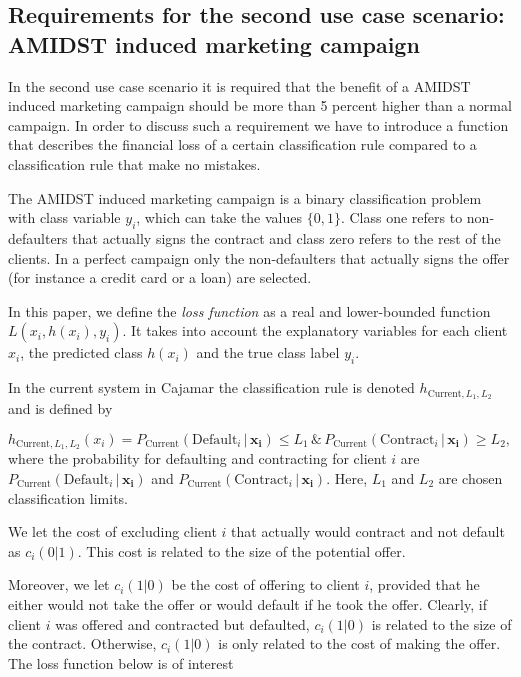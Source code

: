 \documentclass{article}
\theoremstyle{theorem}
\theoremstyle{definition}
\newcommand{\bv}[1]{\bm{#1}}
\begin{document}
\subsection{Requirements for the second use case scenario:  AMIDST induced marketing campaign}

In the second use case scenario it is required that the benefit of a AMIDST induced marketing campaign should be more than 5 percent higher than a normal campaign.  In order to discuss such a requirement we have to introduce a function that describes the financial loss of a certain classification rule compared to a classification rule that make no mistakes. 

The AMIDST induced marketing campaign is a binary classification problem with class variable $y_i$, which can take the values $\{0,1\}$. Class one refers to non-defaulters that actually signs the contract and class zero refers to the rest of the clients.  In a perfect campaign only the non-defaulters that actually signs the offer (for instance a credit card or a loan) are selected.  

In this paper, we define the \emph{loss function} as a real and lower-bounded function $L(x_i, h(x_i), y_i)$. It takes into account the explanatory variables for each client $x_i$, the predicted class $h(x_i)$ and the true class label $y_i$. 

In the current system in Cajamar the classification rule is denoted $h_{\mbox{Current},L_1,L_2}$ and is defined by

\begin{equation}
\label{def:empRisk}
h_{\mbox{Current},L_1,L_2}(x_i) = P_{\mbox{Current}}(\mbox{Default}_i \,|\, \bv{x_i}) \leq L_1 \, \& \,P_{\mbox{Current}}(\mbox{Contract}_i \,|\, \bv{x_i}) \geq L_2,
\end{equation}
where the probability for defaulting and contracting for client $i$ are $P_{\mbox{Current}}(\mbox{Default}_i \,|\, \bv{x_i})$ and $P_{\mbox{Current}}(\mbox{Contract}_i \,|\, \bv{x_i})$.  Here, $L_1$ and $L_2$ are chosen classification limits. 

We let the cost of excluding client $i$ that actually would contract and not default as $c_i(0|1)$.  This cost is related to the size of the potential offer.

Moreover, we let $c_i(1|0)$ be the cost of offering to client $i$, provided that he either would not take the offer or would default if he took the offer.  Clearly, if client $i$ was offered and contracted but defaulted, $c_i(1|0)$ is related to the size of the contract.  Otherwise, $c_i(1|0)$ is only related to the cost of making the offer.  The loss function below is of interest
\end{document}
